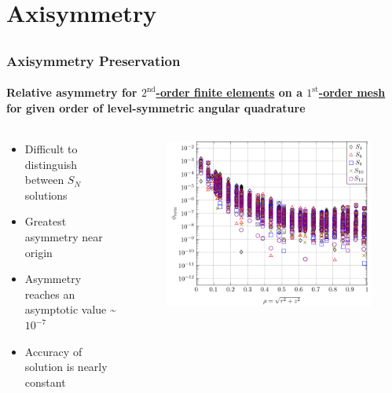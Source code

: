 \documentclass[compress,t]{beamer}
\begin{document}
\section{Axisymmetry}
\subsection{}

\begin{frame}[t]
\frametitle{Axisymmetry Preservation}
\framesubtitle{Relative asymmetry for \underline{$2^\text{nd}$-order finite elements} on a \underline{$1^\text{st}$-order mesh} for given order of level-symmetric angular quadrature}

\begin{columns}[T]

\begin{column}{0.4\textwidth}
\begin{itemize}
\item{Difficult to distinguish between $S_N$ solutions}
\item{Greatest asymmetry near origin}
\item{Asymmetry reaches an asymptotic value \textasciitilde$10^{-7}$}
\item{Accuracy of solution is nearly constant}
\end{itemize}

\end{column}

\begin{column}{0.6\textwidth}
\begin{figure}
\flushright
\includegraphics[scale=0.6]{./graphics/RZASMMSLinearRhoBrunnerp2g1r2.pdf}
\end{figure}

\end{column}

\end{columns}

\end{frame}
\end{document}

